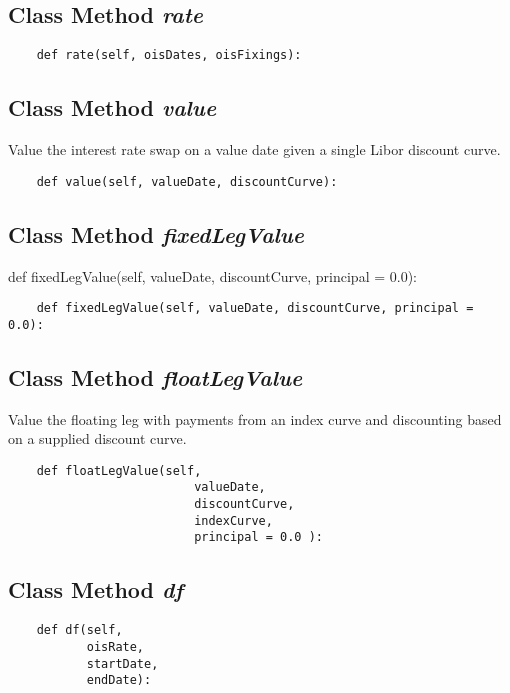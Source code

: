 \documentclass[twoside,11pt]{book}
\begin{document}
\subsection{Class Method {\it rate}}


\begin{lstlisting}
    def rate(self, oisDates, oisFixings):
\end{lstlisting}

\subsection{Class Method {\it value}}
Value the interest rate swap on a value date given a single Libor discount curve. 

\begin{lstlisting}
    def value(self, valueDate, discountCurve):
\end{lstlisting}

\subsection{Class Method {\it fixedLegValue}}
def fixedLegValue(self, valueDate, discountCurve, principal = 0.0):

\begin{lstlisting}
    def fixedLegValue(self, valueDate, discountCurve, principal = 0.0):
\end{lstlisting}

\subsection{Class Method {\it floatLegValue}}
Value the floating leg with payments from an index curve and discounting based on a supplied discount curve. 

\begin{lstlisting}
    def floatLegValue(self, 
                          valueDate, 
                          discountCurve, 
                          indexCurve, 
                          principal = 0.0 ):
\end{lstlisting}

\subsection{Class Method {\it df}}


\begin{lstlisting}
    def df(self, 
           oisRate, 
           startDate, 
           endDate):
\end{lstlisting}
\end{document}
